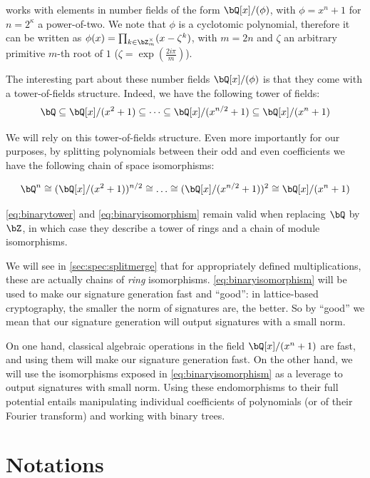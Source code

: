 \falcon works with elements in number fields of the form $\bQ[x]/(\phi)$, with $\phi = x^n+1$ for $n = 2^\kappa$ a power-of-two. We note that $\phi$ is a cyclotomic polynomial, therefore it can be written as $\phi(x) = \prod_{k \in \bZ_{m}^\times} (x - \zeta^k)$, with $m = 2n$ and $\zeta$ an arbitrary primitive $m$-th root of $1$ (\eg $\zeta = \exp(\frac{2i\pi}{m})$).

The interesting part about these number fields $\bQ[x]/(\phi)$ is that they come with a tower-of-fields structure. Indeed, we have the following tower of fields:
\begin{equation}\label{eq:binarytower}
\bQ \subseteq \bQ[x]/(x^{2} + 1) \subseteq \dots \subseteq \bQ[x]/(x^{n/2} + 1) \subseteq \bQ[x]/(x^{n} + 1)
\end{equation}

We will rely on this tower-of-fields structure. Even more importantly for our purposes, by splitting polynomials between their odd and even coefficients we have the following chain of space isomorphisms:

\begin{equation}\label{eq:binaryisomorphism}
\bQ^n \cong (\bQ[x]/(x^{2} + 1))^{n/2} \cong \dots \cong (\bQ[x]/(x^{n/2} + 1))^2 \cong \bQ[x]/(x^{n} + 1)
\end{equation}


\eqref{eq:binarytower} and \eqref{eq:binaryisomorphism} remain valid when replacing $\bQ$ by $\bZ$, in which case they describe a tower of rings and a chain of module isomorphisms.

We will see in \cref{sec:spec:splitmerge} that for appropriately defined multiplications, these are actually chains of \emph{ring} isomorphisms. \eqref{eq:binaryisomorphism} will be used to make our signature generation fast and ``good'': in lattice-based cryptography, the smaller the norm of signatures are, the better. So by ``good'' we mean that our signature generation will output signatures with a small norm.

On one hand, classical algebraic operations in the field $\bQ[x]/(x^{n} + 1)$ are fast, and using them will make our signature generation fast. On the other hand, we will use the isomorphisms exposed in \eqref{eq:binaryisomorphism} as a leverage to output signatures with small norm. Using these endomorphisms to their full potential entails manipulating individual coefficients of polynomials (or of their Fourier transform) and working with binary trees.

\section{Notations}\label{sec:spec:notations}

